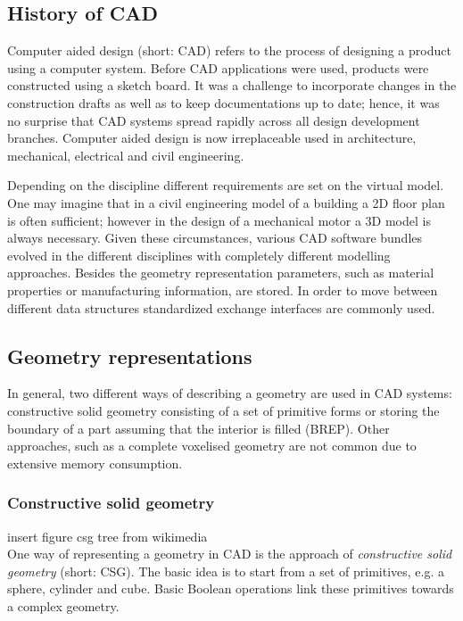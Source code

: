 \subsection{History of CAD}
Computer aided design (short: CAD) refers to the process of designing a product using a computer system. Before CAD applications were used, products were constructed using a sketch board. It was a challenge to incorporate changes in the construction drafts as well as to keep documentations up to date; hence, it was no surprise that CAD systems spread rapidly across all design development branches. Computer aided design is now irreplaceable used in architecture, mechanical, electrical and civil engineering.

Depending on the discipline different requirements are set on the virtual model. One may imagine that in a civil engineering model of a building a 2D floor plan is often sufficient; however in the design of a mechanical motor a 3D model is always necessary. Given these circumstances, various CAD software bundles evolved in the different disciplines with completely different modelling approaches. Besides the geometry representation parameters, such as material properties or manufacturing information, are stored. In order to move between different data structures standardized exchange interfaces are commonly used.
\subsection{Geometry representations}
In general, two different ways of describing a geometry are used in CAD systems: constructive solid geometry consisting of a set of primitive forms or storing the boundary of a part assuming that the interior is filled (BREP). Other approaches, such as a complete voxelised geometry are not common due to extensive memory consumption.
\subsubsection{Constructive solid geometry}
 insert figure csg tree from wikimedia \\
One way of representing a geometry in CAD is the approach of \emph{constructive solid geometry} (short: CSG). The basic idea is to start from a set of primitives, e.g. a sphere, cylinder and cube. Basic Boolean operations link these primitives towards a complex geometry. 


